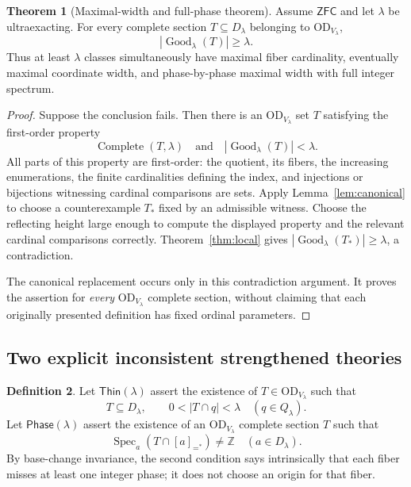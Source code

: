 \documentclass[11pt,letterpaper]{article}
\theoremstyle{definition}
\newtheorem{definition}{Definition}[section]
\newtheorem{theorem}[definition]{Theorem}
\newcommand{\ZFC}{\mathsf{ZFC}}
\newcommand{\OD}{\mathrm{OD}}
\numberwithin{equation}{section}
\newcommand{\ZZ}{\mathbb Z}
\newcommand{\Spec}{\operatorname{Spec}}
\newcommand{\Good}{\operatorname{Good}}
\newcommand{\Thin}{\mathsf{Thin}}
\newcommand{\Phase}{\mathsf{Phase}}
\newcommand{\Complete}{\operatorname{Complete}}
\newcommand{\eqq}[1]{[#1]_{=^{*}}}
\begin{document}
\begin{theorem}[Maximal-width and full-phase theorem]\label{thm:main}
Assume $\ZFC$ and let $\lambda$ be ultraexacting. For every complete section $T\subseteq D_\lambda$ belonging to $\OD_{V_\lambda}$,
\begin{equation}
|\Good_\lambda(T)|\ge\lambda.\label{eq:main}
\end{equation}
Thus at least $\lambda$ classes simultaneously have maximal fiber cardinality, eventually maximal coordinate width, and phase-by-phase maximal width with full integer spectrum.
\end{theorem}
\begin{proof}
Suppose the conclusion fails. Then there is an $\OD_{V_\lambda}$ set $T$ satisfying the first-order property
\[
\Complete(T,\lambda)\quad\text{and}\quad|\Good_\lambda(T)|<\lambda.
\]
All parts of this property are first-order: the quotient, its fibers, the increasing enumerations, the finite cardinalities defining the index, and injections or bijections witnessing cardinal comparisons are sets. Apply Lemma~\ref{lem:canonical} to choose a counterexample $T_*$ fixed by an admissible witness. Choose the reflecting height large enough to compute the displayed property and the relevant cardinal comparisons correctly. Theorem~\ref{thm:local} gives $|\Good_\lambda(T_*)|\ge\lambda$, a contradiction.

The canonical replacement occurs only in this contradiction argument. It proves the assertion for \emph{every} $\OD_{V_\lambda}$ complete section, without claiming that each originally presented definition has fixed ordinal parameters.
\end{proof}

\subsection{Two explicit inconsistent strengthened theories}

\begin{definition}\label{def:bad-principles}
Let $\Thin(\lambda)$ assert the existence of $T\in\OD_{V_\lambda}$ such that
\[
T\subseteq D_\lambda,
\qquad 0<|T\cap q|<\lambda\quad(q\in Q_\lambda).
\]
Let $\Phase(\lambda)$ assert the existence of an $\OD_{V_\lambda}$ complete section $T$ such that
\[
\Spec_a(T\cap\eqq a)\ne\ZZ\quad(a\in D_\lambda).
\]
By base-change invariance, the second condition says intrinsically that each fiber misses at least one integer phase; it does not choose an origin for that fiber.
\end{definition}
\end{document}
